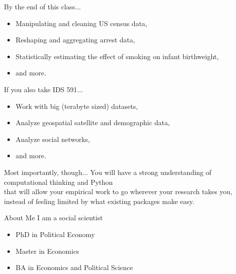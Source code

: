 \documentclass[11pt]{beamer}
\begin{document}
\begin{frame}[c]{By the end of this class...}
\begin{itemize}
	\item Manipulating and cleaning US census data,
	\pause \item Reshaping and aggregating arrest data,
	\pause \item Statistically estimating the effect of smoking on infant birthweight,
	\pause \item and more.
\end{itemize}
\end{frame}

\begin{frame}[c]{If you also take IDS 591...}
\begin{itemize}
	\item Work with big (terabyte sized) datasets,
	\pause \item Analyze geospatial satellite and demographic data,
	\pause \item Analyze social networks,
	\pause \item and more.
\end{itemize}
\end{frame}

\begin{frame}[c]{Most importantly, though...}
You will have a strong understanding of computational thinking and Python\\
\pause that will allow your empirical work to go wherever your research takes you, \\
\pause instead of feeling limited by what existing packages make easy.
\end{frame}


\begin{frame}[c]{About Me}
	I am a social scientist \\
	\vspace{0.5cm}
	\begin{itemize}
		\pause \item PhD in Political Economy
		\pause \item Master in Economics
		\pause \item BA in Economics and Political Science
	\end{itemize}
\end{frame}
\end{document}
